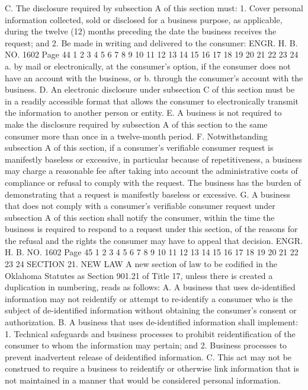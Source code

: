 C. The disclosure required by subsection A of this section
must:
1. Cover personal information collected, sold or disclosed for
a business purpose, as applicable, during the twelve (12) months
preceding the date the business receives the request; and
2. Be made in writing and delivered to the consumer:
ENGR. H. B. NO. 1602 Page 44
1
2
3
4
5
6
7
8
9
10
11
12
13
14
15
16
17
18
19
20
21
22
23
24
a. by mail or electronically, at the consumer's option,
if the consumer does not have an account with the
business, or
b. through the consumer's account with the business.
D. An electronic disclosure under subsection C of this section
must be in a readily accessible format that allows the consumer to
electronically transmit the information to another person or entity.
E. A business is not required to make the disclosure required
by subsection A of this section to the same consumer more than once
in a twelve-month period.
F. Notwithstanding subsection A of this section, if a
consumer's verifiable consumer request is manifestly baseless or
excessive, in particular because of repetitiveness, a business may
charge a reasonable fee after taking into account the administrative
costs of compliance or refusal to comply with the request. The
business has the burden of demonstrating that a request is
manifestly baseless or excessive.
G. A business that does not comply with a consumer's verifiable
consumer request under subsection A of this section shall notify the
consumer, within the time the business is required to respond to a
request under this section, of the reasons for the refusal and the
rights the consumer may have to appeal that decision.
ENGR. H. B. NO. 1602 Page 45
1
2
3
4
5
6
7
8
9
10
11
12
13
14
15
16
17
18
19
20
21
22
23
24
SECTION 21. NEW LAW A new section of law to be codified
in the Oklahoma Statutes as Section 901.21 of Title 17, unless there
is created a duplication in numbering, reads as follows:
A. A business that uses de-identified information may not reidentify or attempt to re-identify a consumer who is the subject of
de-identified information without obtaining the consumer's consent
or authorization.
B. A business that uses de-identified information shall
implement:
1. Technical safeguards and business processes to prohibit reidentification of the consumer to whom the information may pertain;
and
2. Business processes to prevent inadvertent release of deidentified information.
C. This act may not be construed to require a business to reidentify or otherwise link information that is not maintained in a
manner that would be considered personal information.
